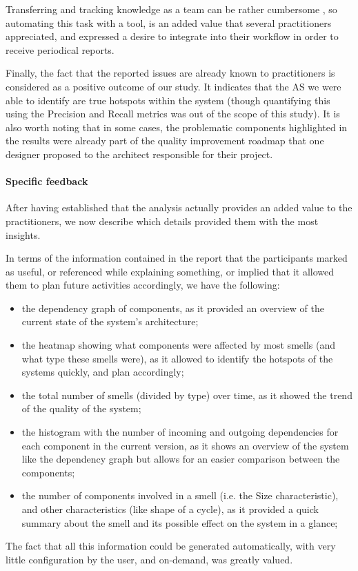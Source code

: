 Transferring and tracking knowledge as a team can be rather cumbersome \cite{Rus2002}, so automating this task with a tool, is an added value that several practitioners appreciated, and expressed a desire to integrate into their workflow in order to receive periodical reports.

Finally, the fact that the reported issues are already known to practitioners is considered as a positive outcome of our study. It indicates that the AS we were able to identify are true hotspots within the system (though quantifying this using the Precision and Recall metrics was out of the scope of this study).
It is also worth noting that in some cases, the problematic components highlighted in the results were already part of the quality improvement roadmap that one designer proposed to the architect responsible for their project. 

\paragraph{Specific feedback}
After having established that the analysis actually provides an added value to the practitioners, we now describe which details provided them with the most insights.

In terms of the information contained in the report that the participants marked as useful, or referenced while explaining something, or implied that it allowed them to plan future activities accordingly, we have the following:
\begin{itemize}
    \item the dependency graph of components, as it provided an overview of the current state of the system's architecture;
    \item the heatmap showing what components were affected by most smells (and what type these smells were), as it allowed to identify the hotspots of the systems quickly, and plan accordingly;
    \item the total number of smells (divided by type) over time, as it showed the trend of the quality of the system;
    \item the histogram with the number of incoming and outgoing dependencies for each component in the current version, as it shows an overview of the system like the dependency graph but allows for an easier comparison between the components;
    \item the number of components involved in a smell (i.e. the Size characteristic), and other characteristics (like shape of a cycle), as it provided a quick summary about the smell and its possible effect on the system in a glance;
\end{itemize}
The fact that all this information could be generated automatically, with very little configuration by the user, and on-demand, was greatly valued.

